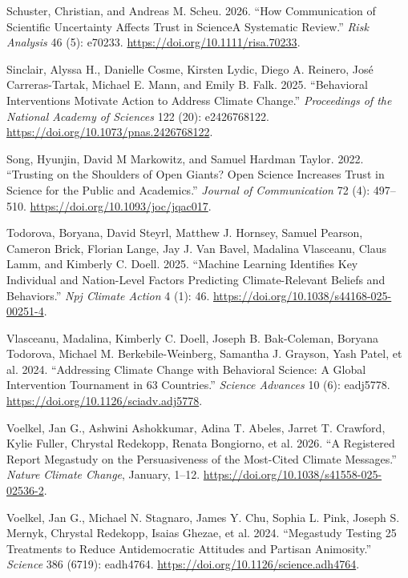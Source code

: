 \documentclass[
  letterpaper,
  DIV=11,
  numbers=noendperiod]{scrartcl}
\newlength{\cslhangindent}
\newenvironment{CSLReferences}[2] %
 {\begin{list}{}{%
  \setlength{\itemindent}{0pt}
  \setlength{\leftmargin}{0pt}
  \setlength{\parsep}{0pt}
  \ifodd #1
   \setlength{\leftmargin}{\cslhangindent}
   \setlength{\itemindent}{-1\cslhangindent}
  \fi
  \setlength{\itemsep}{#2\baselineskip}}}
 {\end{list}}
\begin{document}
\begin{CSLReferences}{1}{0}
Schuster, Christian, and Andreas M. Scheu. 2026. {``How Communication of
Scientific Uncertainty Affects Trust in Science{\textemdash}A Systematic
Review.''} \emph{Risk Analysis} 46 (5): e70233.
\url{https://doi.org/10.1111/risa.70233}.

Sinclair, Alyssa H., Danielle Cosme, Kirsten Lydic, Diego A. Reinero,
José Carreras-Tartak, Michael E. Mann, and Emily B. Falk. 2025.
{``Behavioral Interventions Motivate Action to Address Climate
Change.''} \emph{Proceedings of the National Academy of Sciences} 122
(20): e2426768122. \url{https://doi.org/10.1073/pnas.2426768122}.

Song, Hyunjin, David M Markowitz, and Samuel Hardman Taylor. 2022.
{``Trusting on the Shoulders of Open Giants? Open Science Increases
Trust in Science for the Public and Academics.''} \emph{Journal of
Communication} 72 (4): 497--510.
\url{https://doi.org/10.1093/joc/jqac017}.

Todorova, Boryana, David Steyrl, Matthew J. Hornsey, Samuel Pearson,
Cameron Brick, Florian Lange, Jay J. Van Bavel, Madalina Vlasceanu,
Claus Lamm, and Kimberly C. Doell. 2025. {``Machine Learning Identifies
Key Individual and Nation-Level Factors Predicting Climate-Relevant
Beliefs and Behaviors.''} \emph{Npj Climate Action} 4 (1): 46.
\url{https://doi.org/10.1038/s44168-025-00251-4}.

Vlasceanu, Madalina, Kimberly C. Doell, Joseph B. Bak-Coleman, Boryana
Todorova, Michael M. Berkebile-Weinberg, Samantha J. Grayson, Yash
Patel, et al. 2024. {``Addressing Climate Change with Behavioral
Science: A Global Intervention Tournament in 63 Countries.''}
\emph{Science Advances} 10 (6): eadj5778.
\url{https://doi.org/10.1126/sciadv.adj5778}.

Voelkel, Jan G., Ashwini Ashokkumar, Adina T. Abeles, Jarret T.
Crawford, Kylie Fuller, Chrystal Redekopp, Renata Bongiorno, et al.
2026. {``A Registered Report Megastudy on the Persuasiveness of the
Most-Cited Climate Messages.''} \emph{Nature Climate Change}, January,
1--12. \url{https://doi.org/10.1038/s41558-025-02536-2}.

Voelkel, Jan G., Michael N. Stagnaro, James Y. Chu, Sophia L. Pink,
Joseph S. Mernyk, Chrystal Redekopp, Isaias Ghezae, et al. 2024.
{``Megastudy Testing 25 Treatments to Reduce Antidemocratic Attitudes
and Partisan Animosity.''} \emph{Science} 386 (6719): eadh4764.
\url{https://doi.org/10.1126/science.adh4764}.

\end{CSLReferences}
\end{document}

